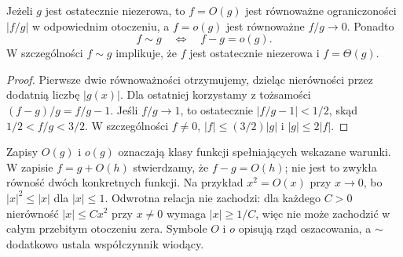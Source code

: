 \begin{stwierdzenie}
\label{ma1:prop:landau-ratios}
Jeżeli $g$ jest ostatecznie niezerowa, to $f=O(g)$ jest równoważne ograniczoności $|f/g|$ w odpowiednim otoczeniu, a $f=o(g)$ jest równoważne $f/g\to0$. Ponadto
\[
 f\sim g \quad\Longleftrightarrow\quad f-g=o(g).
\]
W szczególności $f\sim g$ implikuje, że $f$ jest ostatecznie niezerowa i $f=\Theta(g)$.
\end{stwierdzenie}
\begin{proof}
Pierwsze dwie równoważności otrzymujemy, dzieląc nierówności przez dodatnią liczbę $|g(x)|$. Dla ostatniej korzystamy z tożsamości $(f-g)/g=f/g-1$. Jeśli $f/g\to1$, to ostatecznie $|f/g-1|<1/2$, skąd $1/2<f/g<3/2$. W szczególności $f\ne0$, $|f|\le(3/2)|g|$ i $|g|\le2|f|$.
\end{proof}
Zapisy $O(g)$ i $o(g)$ oznaczają klasy funkcji spełniających wskazane warunki. W zapisie $f=g+O(h)$ stwierdzamy, że $f-g=O(h)$; nie jest to zwykła równość dwóch konkretnych funkcji. Na przykład $x^2=O(x)$ przy $x\to0$, bo $|x|^2\le|x|$ dla $|x|\le1$. Odwrotna relacja nie zachodzi: dla każdego $C>0$ nierówność $|x|\le Cx^2$ przy $x\ne0$ wymaga $|x|\ge1/C$, więc nie może zachodzić w całym przebitym otoczeniu zera. Symbole $O$ i $o$ opisują rząd oszacowania, a $\sim$ dodatkowo ustala współczynnik wiodący.

